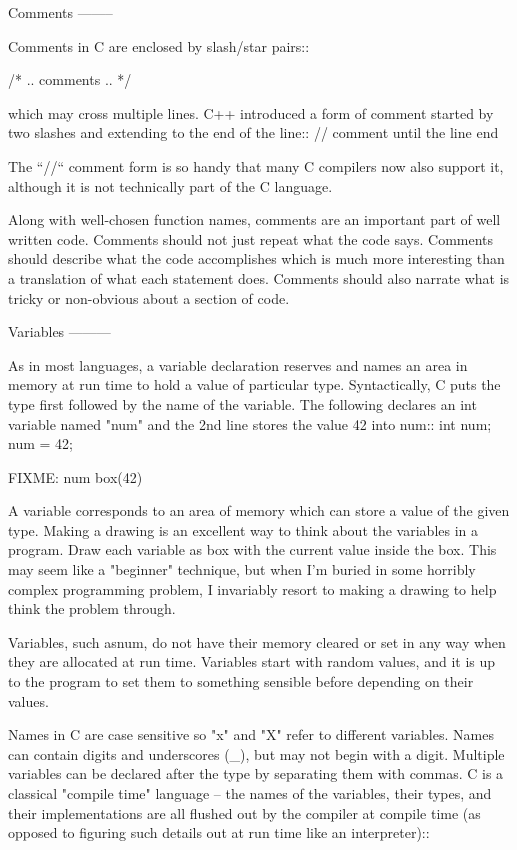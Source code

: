 Comments
--------

Comments in C are enclosed by slash/star pairs::

    /* .. comments .. */ 

which may cross multiple lines. C++ introduced a form of comment started by two slashes and extending to the end of the line::
    // comment until the line end

The ``//`` comment form is so handy that many C compilers now also support it, although it is not technically part of the C language.

Along with well-chosen function names, comments are an important part of well written code. Comments should not just repeat what the code says. Comments should describe what the code accomplishes which is much more interesting than a translation of what each statement does. Comments should also narrate what is tricky or non-obvious about a section of code.

Variables
---------

As in most languages, a variable declaration reserves and names an area in memory at run time to hold a value of particular type. Syntactically, C puts the type first followed by the name of the variable. The following declares an int variable named "num" and the 2nd line stores the value 42 into num::
   int num;
   num = 42;

FIXME: num box(42)
   
A variable corresponds to an area of memory which can store a value of the given type. Making a drawing is an excellent way to think about the variables in a program. Draw each variable as box with the current value inside the box. This may seem like a "beginner" technique, but when I'm buried in some horribly complex programming problem, I invariably resort to making a drawing to help think the problem through.

Variables, such asnum, do not have their memory cleared or set in any way when they are allocated at run time. Variables start with random values, and it is up to the program to set them to something sensible before depending on their values.

Names in C are case sensitive so "x" and "X" refer to different variables. Names can contain digits and underscores (_), but may not begin with a digit. Multiple variables can be declared after the type by separating them with commas. C is a classical "compile time" language -- the names of the variables, their types, and their implementations are all flushed out by the compiler at compile time (as opposed to figuring such details out at run time like an interpreter)::

